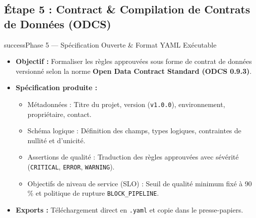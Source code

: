 \documentclass[11pt,a4paper]{article}
\begin{document}
\newpage

\subsection*{Étape 5 : Contract \& Compilation de Contrats de Données (ODCS)}
\begin{stepbox}{success}{Phase 5 — Spécification Ouverte \& Format YAML Exécutable}
\begin{itemize}
    \item \textbf{Objectif :} Formaliser les règles approuvées sous forme de contrat de données versionné selon la norme \textbf{Open Data Contract Standard (ODCS 0.9.3)}.
    \item \textbf{Spécification produite :}
    \begin{itemize}
        \item Métadonnées : Titre du projet, version (\texttt{v1.0.0}), environnement, propriétaire, contact.
        \item Schéma logique : Définition des champs, types logiques, contraintes de nullité et d'unicité.
        \item Assertions de qualité : Traduction des règles approuvées avec sévérité (\texttt{CRITICAL}, \texttt{ERROR}, \texttt{WARNING}).
        \item Objectifs de niveau de service (SLO) : Seuil de qualité minimum fixé à 90\,\% et politique de rupture \texttt{BLOCK\_PIPELINE}.
    \end{itemize}
    \item \textbf{Exports :} Téléchargement direct en \texttt{.yaml} et copie dans le presse-papiers.
\end{itemize}
\end{stepbox}
\end{document}
